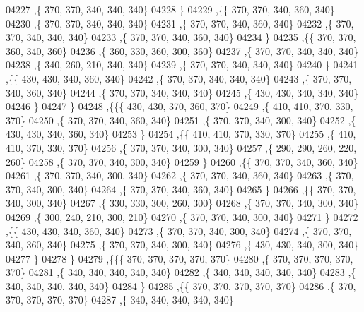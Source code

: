 \begin{DoxyCode}
04227     ,\{   370,   370,   340,   340,   340\}
04228     \}
04229    ,\{\{   370,   370,   340,   360,   340\}
04230     ,\{   370,   370,   340,   340,   340\}
04231     ,\{   370,   370,   340,   360,   340\}
04232     ,\{   370,   370,   340,   340,   340\}
04233     ,\{   370,   370,   340,   360,   340\}
04234     \}
04235    ,\{\{   370,   370,   360,   340,   360\}
04236     ,\{   360,   330,   360,   300,   360\}
04237     ,\{   370,   370,   340,   340,   340\}
04238     ,\{   340,   260,   210,   340,   340\}
04239     ,\{   370,   370,   340,   340,   340\}
04240     \}
04241    ,\{\{   430,   430,   340,   360,   340\}
04242     ,\{   370,   370,   340,   340,   340\}
04243     ,\{   370,   370,   340,   360,   340\}
04244     ,\{   370,   370,   340,   340,   340\}
04245     ,\{   430,   430,   340,   340,   340\}
04246     \}
04247    \}
04248   ,\{\{\{   430,   430,   370,   360,   370\}
04249     ,\{   410,   410,   370,   330,   370\}
04250     ,\{   370,   370,   340,   360,   340\}
04251     ,\{   370,   370,   340,   300,   340\}
04252     ,\{   430,   430,   340,   360,   340\}
04253     \}
04254    ,\{\{   410,   410,   370,   330,   370\}
04255     ,\{   410,   410,   370,   330,   370\}
04256     ,\{   370,   370,   340,   300,   340\}
04257     ,\{   290,   290,   260,   220,   260\}
04258     ,\{   370,   370,   340,   300,   340\}
04259     \}
04260    ,\{\{   370,   370,   340,   360,   340\}
04261     ,\{   370,   370,   340,   300,   340\}
04262     ,\{   370,   370,   340,   360,   340\}
04263     ,\{   370,   370,   340,   300,   340\}
04264     ,\{   370,   370,   340,   360,   340\}
04265     \}
04266    ,\{\{   370,   370,   340,   300,   340\}
04267     ,\{   330,   330,   300,   260,   300\}
04268     ,\{   370,   370,   340,   300,   340\}
04269     ,\{   300,   240,   210,   300,   210\}
04270     ,\{   370,   370,   340,   300,   340\}
04271     \}
04272    ,\{\{   430,   430,   340,   360,   340\}
04273     ,\{   370,   370,   340,   300,   340\}
04274     ,\{   370,   370,   340,   360,   340\}
04275     ,\{   370,   370,   340,   300,   340\}
04276     ,\{   430,   430,   340,   300,   340\}
04277     \}
04278    \}
04279   ,\{\{\{   370,   370,   370,   370,   370\}
04280     ,\{   370,   370,   370,   370,   370\}
04281     ,\{   340,   340,   340,   340,   340\}
04282     ,\{   340,   340,   340,   340,   340\}
04283     ,\{   340,   340,   340,   340,   340\}
04284     \}
04285    ,\{\{   370,   370,   370,   370,   370\}
04286     ,\{   370,   370,   370,   370,   370\}
04287     ,\{   340,   340,   340,   340,   340\}

\end{DoxyCode}
